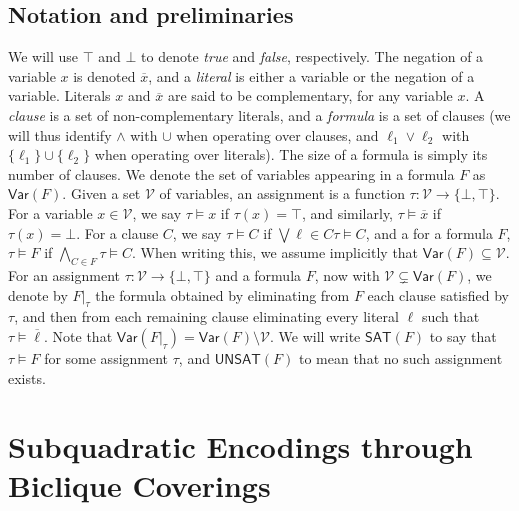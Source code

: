 \documentclass[11pt]{article}
\begin{document}
\subsection{Notation and preliminaries}

We will use $\top$ and $\bot$ to denote \emph{true} and \emph{false}, respectively. The negation of a variable $x$ is denoted $\overline{x}$, and a \emph{literal} is either a variable or the negation of a variable. Literals $x$ and $\overline{x}$ are said to be complementary, for any variable $x$. A \emph{clause} is a set of non-complementary literals, and a \emph{formula} is a set of clauses (we will thus identify $\land$ with $\cup$ when operating over clauses, and $\ell_1 \lor \ell_2$ with $\{\ell_1\} \cup \{\ell_2\}$ when operating over literals). The size of a formula is simply its number of clauses.
We denote the set of variables appearing in a formula $F$ as $\textsf{Var}(F)$. 
Given a set $\mathcal{V}$ of variables, an assignment is a function $\tau : \mathcal{V} \to \{\bot, \top\}$. For a variable $x \in \mathcal{V}$, we say $\tau \models x$ if $\tau(x) = \top$, and similarly, $\tau \models \overline{x}$ if $\tau(x) = \bot$. For a clause $C$, we say $\tau \models C$ if $\bigvee{\ell \in C} \tau \models C$, and a for a formula $F$, $\tau \models F$ if $\bigwedge_{C \in F} \tau \models C$. When writing this, we assume implicitly that $\textsf{Var}(F) \subseteq \mathcal{V}$.
For an assignment $\tau: \mathcal{V} \to \{\bot, \top\}$ and a formula $F$, now with $\mathcal{V} \subsetneq \textsf{Var}(F)$, we denote by $F|_\tau$ the formula obtained by eliminating from $F$ each clause satisfied by $\tau$, and then from each remaining clause eliminating every literal $\ell$ such that $\tau \models \overline{\ell}$. Note that $\textsf{Var}(F|_\tau) = \textsf{Var}(F) \setminus \mathcal{V}$.
We will write $\textsf{SAT}(F)$ to say that $\tau \models F$ for some assignment $\tau$, and $\textsf{UNSAT}(F)$ to mean that no such assignment exists.


\section{Subquadratic Encodings through Biclique Coverings}\label{sec:biclique_encodings}
\end{document}

